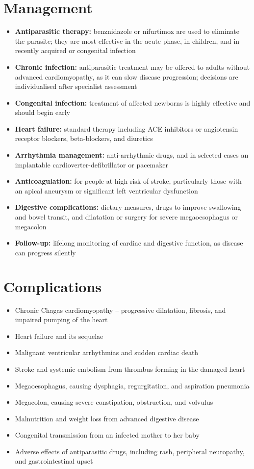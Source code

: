 \section*{Management}
\begin{itemize}
    \item \textbf{Antiparasitic therapy:} benznidazole or nifurtimox are used to eliminate the parasite; they are most effective in the acute phase, in children, and in recently acquired or congenital infection
    \item \textbf{Chronic infection:} antiparasitic treatment may be offered to adults without advanced cardiomyopathy, as it can slow disease progression; decisions are individualised after specialist assessment
    \item \textbf{Congenital infection:} treatment of affected newborns is highly effective and should begin early
    \item \textbf{Heart failure:} standard therapy including ACE inhibitors or angiotensin receptor blockers, beta-blockers, and diuretics
    \item \textbf{Arrhythmia management:} anti-arrhythmic drugs, and in selected cases an implantable cardioverter-defibrillator or pacemaker
    \item \textbf{Anticoagulation:} for people at high risk of stroke, particularly those with an apical aneurysm or significant left ventricular dysfunction
    \item \textbf{Digestive complications:} dietary measures, drugs to improve swallowing and bowel transit, and dilatation or surgery for severe megaoesophagus or megacolon
    \item \textbf{Follow-up:} lifelong monitoring of cardiac and digestive function, as disease can progress silently
\end{itemize}

\section*{Complications}
\begin{itemize}
    \item Chronic Chagas cardiomyopathy -- progressive dilatation, fibrosis, and impaired pumping of the heart
    \item Heart failure and its sequelae
    \item Malignant ventricular arrhythmias and sudden cardiac death
    \item Stroke and systemic embolism from thrombus forming in the damaged heart
    \item Megaoesophagus, causing dysphagia, regurgitation, and aspiration pneumonia
    \item Megacolon, causing severe constipation, obstruction, and volvulus
    \item Malnutrition and weight loss from advanced digestive disease
    \item Congenital transmission from an infected mother to her baby
    \item Adverse effects of antiparasitic drugs, including rash, peripheral neuropathy, and gastrointestinal upset
\end{itemize}


